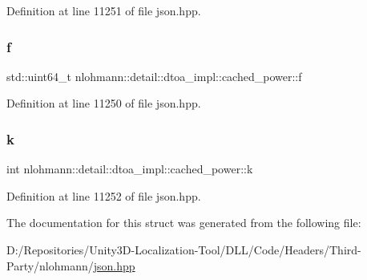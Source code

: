 Definition at line 11251 of file json.\+hpp.

\mbox{\label{structnlohmann_1_1detail_1_1dtoa__impl_1_1cached__power_a21ae81f515f5b08d5bf423775ee56074}} 
\subsubsection{\texorpdfstring{f}{f}}
{\footnotesize\ttfamily std\+::uint64\+\_\+t nlohmann\+::detail\+::dtoa\+\_\+impl\+::cached\+\_\+power\+::f}



Definition at line 11250 of file json.\+hpp.

\mbox{\label{structnlohmann_1_1detail_1_1dtoa__impl_1_1cached__power_a8c1f2efed643eeaa8fae83c697a29c6a}} 
\subsubsection{\texorpdfstring{k}{k}}
{\footnotesize\ttfamily int nlohmann\+::detail\+::dtoa\+\_\+impl\+::cached\+\_\+power\+::k}



Definition at line 11252 of file json.\+hpp.



The documentation for this struct was generated from the following file\+:\begin{DoxyCompactItemize}
\item 
D\+:/\+Repositories/\+Unity3\+D-\/\+Localization-\/\+Tool/\+D\+L\+L/\+Code/\+Headers/\+Third-\/\+Party/nlohmann/\mbox{\hyperlink{json_8hpp}{json.\+hpp}}\end{DoxyCompactItemize}

